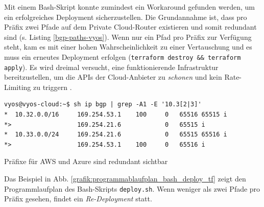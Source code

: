 Mit einem Bash-Skript konnte zumindest ein Workaround gefunden werden, um ein erfolgreiches \gls{Deployment} sicherzustellen. Die Grundannahme ist, dass pro Präfix zwei Pfade auf dem Private Cloud-Router existieren und somit redundant sind (s. Listing \ref{bgp-paths-vyos}). Wenn nur ein Pfad pro Präfix zur Verfügung steht, kam es mit einer hohen Wahrscheinlichkeit zu einer Vertauschung und es muss ein erneutes \gls{Deployment} erfolgen (\texttt{terraform destroy \&\& terraform apply}). Es wird dreimal versucht, eine funktionierende Infrastruktur bereitzustellen, um die APIs der Cloud-Anbieter zu \textit{schonen} und kein Rate-Limiting zu triggern \cite{awsthrottling2021}.
\begin{listing}[h]
\begin{verbatim}
vyos@vyos-cloud:~$ sh ip bgp | grep -A1 -E '10.3[2|3]'
*  10.32.0.0/16     169.254.53.1    100     0   65516 65515 i
*>                  169.254.21.6            0   65515 i
*  10.33.0.0/24     169.254.21.6            0   65515 65516 i
*>                  169.254.53.1    100     0   65516 i

\end{verbatim}
\caption{Präfixe für AWS und Azure sind redundant sichtbar}
\label{bgp-paths-vyos}
\end{listing}
\newpage
Das Beispiel in Abb. \ref{grafik:programmablaufplan_bash_deploy_tf} zeigt den Programmlaufplan des Bash-Skripts \texttt{deploy.sh}. Wenn weniger als zwei Pfade pro Präfix gesehen, findet ein \textit{Re-\gls{Deployment}} statt.

